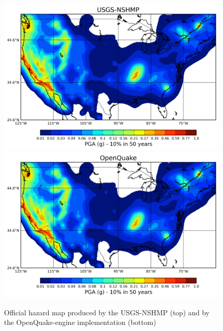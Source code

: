 \begin{figure}
\centering
\includegraphics[width=14cm]{./qareport/pictures/map_usa_PGA_0pt1_NSHMP.pdf}
\includegraphics[width=14cm]{./qareport/pictures/map_usa_PGA_0pt1_OQ.pdf}
\caption{Official hazard map produced by the USGS-NSHMP (top) and by the OpenQuake-engine implementation (bottom)}
\label{fig:usa_475y_hmaps}
\end{figure}
